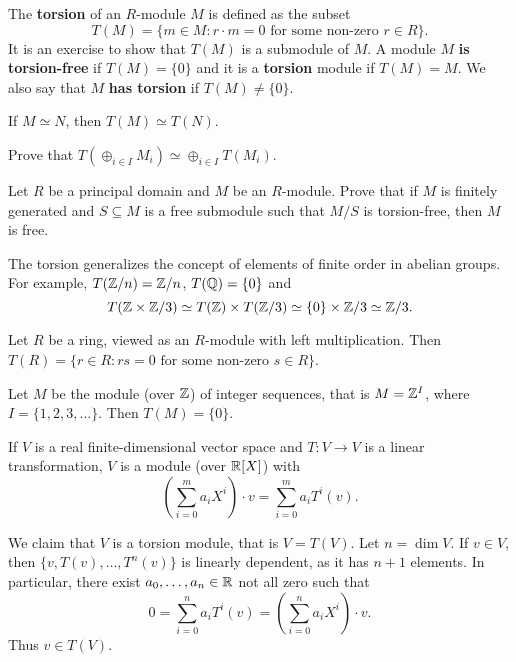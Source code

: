 The \textbf{torsion} of an $R$-module $M$ 
is defined as the subset 
\[
T(M)=\{m\in M:r\cdot m=0\text{ for some non-zero $r\in R$}\}.
\]
It is an exercise to show that $T(M)$ is a submodule of $M$. 
A module $M$ 
\textbf{is torsion-free} if $T(M)=\{0\}$ and it is 
a \textbf{torsion} module if $T(M)=M$.  We also say that $M$ \textbf{has torsion}
if $T(M)\ne\{0\}$. 

\begin{exercise}
If $M\simeq N$, then $T(M)\simeq T(N)$.
\end{exercise}

\begin{exercise}
Prove that $T(\oplus_{i\in I}M_i)\simeq \oplus_{i\in I}T(M_i)$.
\end{exercise}

\begin{exercise}
\label{xca:free}
    Let $R$ be a principal domain and $M$ be an $R$-module. Prove that
    if $M$ is finitely generated and $S\subseteq M$ is a free submodule such that
    $M/S$ is torsion-free, then $M$ is free.
\end{exercise}

The torsion generalizes the concept of elements of finite order in abelian groups. For example, 
 $T(\mathbb{Z}/n)=\mathbb{Z}/n$, $T(\mathbb{Q})=\{0\}$ and
 \[
 T(\mathbb{Z}\times\mathbb{Z}/3)\simeq T(\mathbb{Z})\times T(\mathbb{Z}/3)\simeq \{0\}\times\mathbb{Z}/3\simeq\mathbb{Z}/3.
 \]

\begin{example}
    Let $R$ be a ring, viewed as an $R$-module with left multiplication. 
    Then $T(R)=\{r\in R:rs=0\text{ for some non-zero $s\in R$}\}$.
\end{example}

\begin{example}
    Let $M$ be the module (over $\mathbb{Z}$) of
    integer sequences, that is $M=\mathbb{Z}^I$, where 
    $I=\{1,2,3,\dots\}$. Then $T(M)=\{0\}$. 
\end{example}

\begin{example}
If $V$ is a real finite-dimensional vector space and $T\colon V\to V$ 
is a linear transformation, $V$ is a module (over $\mathbb{R}[X]$) 
with 
\[
\left(\sum_{i=0}^m a_iX^i\right)\cdot v=\sum_{i=0}^m a_iT^i(v).
\]

We claim that 
$V$ is a torsion module, that is $V=T(V)$. Let $n=\dim V$. If $v\in V$, 
then $\{v,T(v),\dots,T^n(v)\}$ is linearly dependent, as it has 
$n+1$ elements. In particular, there exist $a_0,\dots,a_n\in\mathbb{R}$ not all zero such that
\[
0=\sum_{i=0}^n a_iT^i(v)=\left(\sum_{i=0}^n a_iX^i\right)\cdot v.
\]
Thus $v\in T(V)$. 
\end{example}

